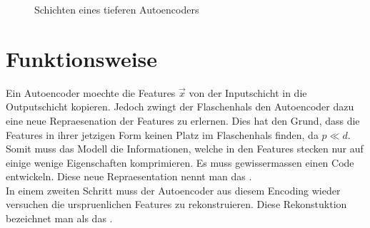 \begin{figure}[h!]
  \label{fig:big_autoencoder}
  \caption{Schichten eines tieferen Autoencoders}
\end{figure}

\section{Funktionsweise}
Ein Autoencoder moechte die Features $\vec{x}$ von der Inputschicht in die
Outputschicht kopieren. Jedoch zwingt der Flaschenhals den Autoencoder dazu eine
neue Repraesenation der Features zu erlernen. Dies hat den Grund, dass die
Features in ihrer jetzigen Form keinen Platz im Flaschenhals finden, da $p \ll d$.
Somit muss das Modell die Informationen, welche in den Features stecken
nur auf einige wenige Eigenschaften komprimieren. Es muss gewissermassen einen
Code entwickeln. Diese neue Repraesentation nennt man das . \\
In einem zweiten Schritt muss der Autoencoder aus diesem Encoding wieder
versuchen die urspruenlichen Features zu rekonstruieren. Diese Rekonstuktion
bezeichnet man als das .

